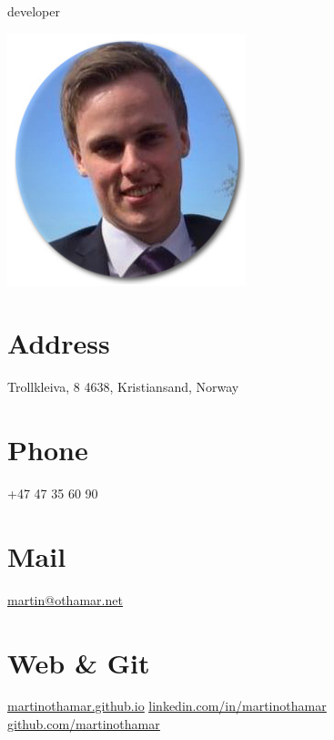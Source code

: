 \documentclass[]{cv-class}
\begin{document}
      {developer}
      
\vspace{1.15cm}  

\begin{aside}
  \includegraphics[scale=0.40]{img/meg2.jpg}
  	~
  \section{Address}
    Trollkleiva, 8
    4638, Kristiansand, Norway
    ~
  \section{Phone}
    +47 47 35 60 90
    ~
  \section{Mail}
    \underline{\href{mailto:martin@othamar.net}{martin@othamar.net}}
    ~
  \section{Web \& Git}
  	\underline{\href{http://martinothamar.github.io}{martinothamar.github.io}}
    \underline{\href{https://no.linkedin.com/in/martinothamar}{linkedin.com/in/martinothamar}}
    \underline{\href{https://github.com/martinothamar}{github.com/martinothamar}}
    ~

\end{aside}
\end{document}
